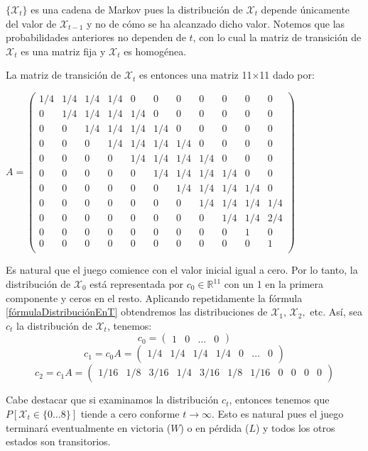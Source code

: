 \begin{exampleth}
$\{\mathcal{X}_t\}$ es una cadena de Markov pues la distribución de $\mathcal{X}_t$ depende únicamente del valor de $\mathcal{X}_{t-1}$ y no de cómo se ha alcanzado dicho valor. Notemos que las probabilidades anteriores no dependen de $t$, con lo cual la matriz de transición de $\mathcal{X}_t$ es una matriz fija y $\mathcal{X}_t$ es homogénea. 

La matriz de transición de $\mathcal{X}_t$ es entonces una matriz 11$\times$11 dado por:

\begin{center}
    $A=\begin{pmatrix}
    1/4 & 1/4 & 1/4 & 1/4 & 0 & 0 & 0 & 0 & 0 & 0 & 0 \\   
    0 & 1/4 & 1/4 & 1/4 & 1/4 & 0 & 0 & 0 & 0 & 0 & 0 \\
    0 & 0 & 1/4 & 1/4 & 1/4 & 1/4 & 0 & 0 & 0 & 0 & 0 \\
    0 & 0 & 0 & 1/4 & 1/4 & 1/4 & 1/4 & 0 & 0 & 0 & 0 \\
    0 & 0 & 0 & 0 & 1/4 & 1/4 & 1/4 & 1/4 & 0 & 0 & 0 \\
    0 & 0 & 0 & 0 & 0 & 1/4 & 1/4 & 1/4 & 1/4 & 0 & 0 \\
    0 & 0 & 0 & 0 & 0 & 0 & 1/4 & 1/4 & 1/4 & 1/4 & 0 \\
    0 & 0 & 0 & 0 & 0 & 0 & 0 & 1/4 & 1/4 & 1/4 & 1/4 \\
    0 & 0 & 0 & 0 & 0 & 0 & 0 & 0 & 1/4 & 1/4 & 2/4 \\
    0 & 0 & 0 & 0 & 0 & 0 & 0 & 0 & 0 & 1 & 0 \\
    0 & 0 & 0 & 0 & 0 & 0 & 0 & 0 & 0 & 0 & 1 \\
    \end{pmatrix}$
\end{center}

Es natural que el juego comience con el valor inicial igual a cero. Por lo tanto, la distribución de $\mathcal{X}_0$ está representada por $c_0\in\mathbb{R}^{11}$ con un 1 en la primera componente y ceros en el resto. Aplicando repetidamente la fórmula \eqref{fórmulaDistribuciónEnT} obtendremos las distribuciones de $\mathcal{X}_1,\,\mathcal{X}_2,$ etc. Así, sea $c_t$ la distribución de $\mathcal{X}_t$, tenemos:
\[
c_0=\begin{pmatrix}
1 & 0 & \dots & 0
\end{pmatrix}\]
\[
c_1=c_0A=\begin{pmatrix}
1/4 & 1/4 & 1/4 & 1/4 & 0 & \dots & 0
\end{pmatrix}\]
\[
c_2=c_1A=\begin{pmatrix}
1/16 & 1/8 & 3/16 & 1/4 & 3/16 & 1/8 & 1/16  & 0 & 0 & 0 & 0
\end{pmatrix}
\]

Cabe destacar que si examinamos la distribución $c_t$, entonces tenemos que $P[\mathcal{X}_t\in\{0\dots8\}]$ tiende a cero conforme $t\rightarrow\infty$. Esto es natural pues el juego terminará eventualmente en victoria ($W$) o en pérdida ($L$) y todos los otros estados son transitorios. 

\end{exampleth}

